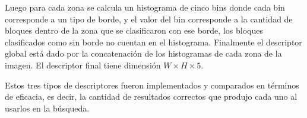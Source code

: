 Luego para cada zona se calcula un histograma de cinco bins donde cada bin corresponde a un tipo de borde, y el valor del bin corresponde a la cantidad de bloques dentro de la zona que se clasificaron con ese borde, los bloques clasificados como sin borde no cuentan en el histograma.
Finalmente el descriptor global está dado por la concatenación de los histogramas de cada zona de la imagen. El descriptor final tiene dimensión 
$W \times H \times 5$.

Estos tres tipos de descriptores fueron implementados y comparados en términos de eficacia, es decir, la cantidad de resultados correctos que produjo cada uno al usarlos en la búsqueda. 

